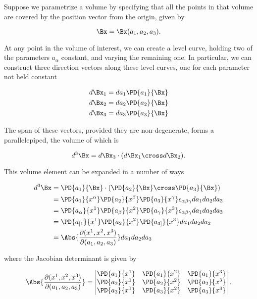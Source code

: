 Suppose we parametrize a volume by specifying that all the points in that volume are covered by the position vector from the origin, given by

\begin{equation}\label{eqn:relativisticElectrodynamicsPS6:360}
\Bx = \Bx(a_1, a_2, a_3).
\end{equation}

At any point in the volume of interest, we can create a level curve, holding two of the parameters $a_\alpha$ constant, and varying the remaining one.  In particular, we can construct three direction vectors along these level curves, one for each parameter not held constant

\begin{align}\label{eqn:relativisticElectrodynamicsPS6:380}
d\Bx_1 &= da_1 \PD{a_1}{\Bx} \\
d\Bx_2 &= da_2 \PD{a_2}{\Bx} \\
d\Bx_3 &= da_3 \PD{a_3}{\Bx}
\end{align}

The span of these vectors, provided they are non-degenerate, forms a parallelepiped, the volume of which is

\begin{equation}\label{eqn:relativisticElectrodynamicsPS6:400}
d^3\Bx = d\Bx_3 \cdot (d\Bx_1 \cross d\Bx_2).
\end{equation}

This volume element can be expanded in a number of ways

\begin{align*}
d^3\Bx 
&= \PD{a_1}{\Bx} \cdot \left( \PD{a_2}{\Bx} \cross \PD{a_3}{\Bx} \right) \\
&= 
\PD{a_1}{x^\alpha} 
\PD{a_2}{x^\beta} 
\PD{a_3}{x^\gamma} 
\epsilon_{\alpha \beta \gamma} 
da_1 da_2 da_3 \\
&= 
\PD{a_\alpha}{x^1} 
\PD{a_\beta}{x^2} 
\PD{a_\gamma}{x^3} 
\epsilon_{\alpha \beta \gamma} 
da_1 da_2 da_3 \\
&= 
\PD{a_{[1}}{x^1} 
\PD{a_{2}}{x^2} 
\PD{a_{3]}}{x^3} 
da_1 da_2 da_2 \\
&= 
\Abs{ \frac{\partial(x^1, x^2, x^3)}{\partial (a_1, a_2, a_3)}}
da_1 da_2 da_3 \\
\end{align*}

where the Jacobian determinant is given by

\begin{equation}\label{eqn:relativisticElectrodynamicsPS6:420}
\Abs{ \frac{\partial(x^1, x^2, x^3)}{\partial (a_1, a_2, a_3)}}
= 
\begin{vmatrix}
 \PD{a_1}{x^1} & \PD{a_1}{x^2} & \PD{a_1}{x^3} \\
 \PD{a_2}{x^1} & \PD{a_2}{x^2} & \PD{a_2}{x^3} \\
 \PD{a_3}{x^1} & \PD{a_3}{x^2} & \PD{a_3}{x^3}
\end{vmatrix}.
\end{equation}

